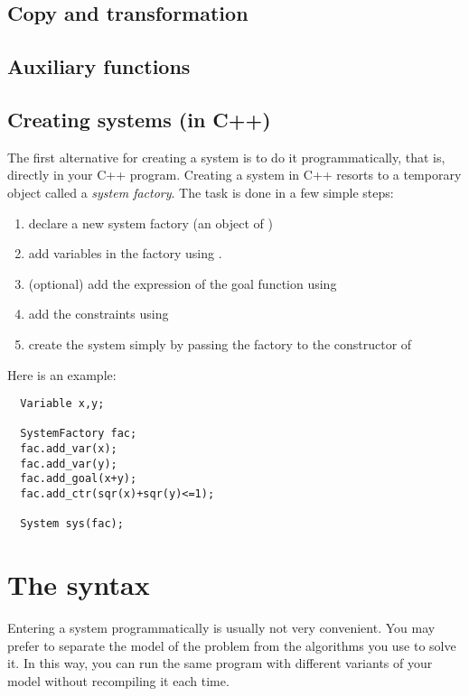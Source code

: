 \subsection{Copy and transformation}\label{sec:mod-sys-transfo}

\subsection{Auxiliary functions}\label{sec:mod-sys-auxfunc}

\subsection{Creating systems (in C++)}

The first alternative for creating a system is to do it programmatically, that is, directly in your C++ program.
Creating a system in C++ resorts to a temporary object called a {\it system factory}. The task is done in a few simple steps:
\begin{enumerate}
\item declare a new system factory (an object of )
\item add variables in the factory using .
\item (optional) add the expression of the goal function using 
\item add the constraints using 
\item create the system simply by passing the factory to the constructor of 
\end{enumerate}

Here is an example:

\begin{lstlisting}
  Variable x,y;

  SystemFactory fac;
  fac.add_var(x);
  fac.add_var(y);
  fac.add_goal(x+y);
  fac.add_ctr(sqr(x)+sqr(y)<=1);

  System sys(fac);
\end{lstlisting}

\section{The \quimper syntax}\label{sec:mod-sys-load}

Entering a system programmatically is usually not very convenient.
You may prefer to separate the model of the problem from the algorithms
you use to solve it. In this way, you can run the same program with different
variants of your model without recompiling it each time.

